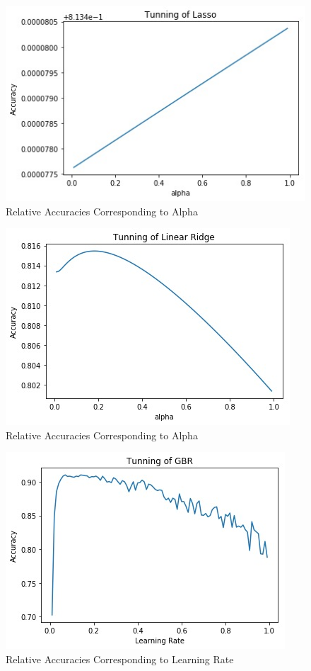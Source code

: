 \documentclass[letterpaper,10pt]{article}
\begin{document}
\begin{figure}[H]
    \centering
    \includegraphics[scale=0.7]{Lasso.jpeg}
    \caption{Relative Accuracies Corresponding to Alpha}
    \label{fig:Content-basedRecommender}
\end{figure}
\begin{figure}[H]
    \centering
    \includegraphics[scale=0.7]{Ridge.jpeg}
    \caption{Relative Accuracies Corresponding to Alpha}
    \label{fig:Content-basedRecommender}
\end{figure}
\begin{figure}[H]
    \centering
    \includegraphics[scale=0.7]{TunningGBR.jpeg}
    \caption{Relative Accuracies Corresponding to Learning Rate}
    \label{fig:Content-basedRecommender}
\end{figure}
\end{document}
